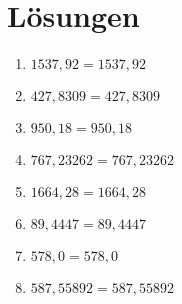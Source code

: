 \documentclass{article}%
\begin{document}
\section*{Lösungen}%
\begin{enumerate}%
\item%
$1537,92 = 1537,92$%
\item%
$427,8309 = 427,8309$%
\item%
$950,18 = 950,18$%
\item%
$767,23262 = 767,23262$%
\item%
$1664,28 = 1664,28$%
\item%
$89,4447 = 89,4447$%
\item%
$578,0 = 578,0$%
\item%
$587,55892 = 587,55892$%
\end{enumerate}%
\newpage

%
\end{document}
